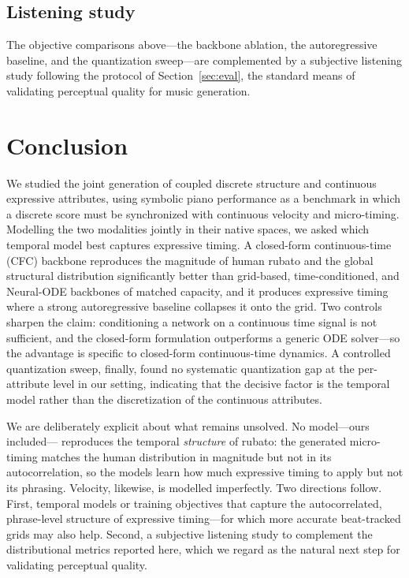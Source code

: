 \documentclass[review]{elsarticle}
\begin{document}
\subsection{Listening study}
The objective comparisons above---the backbone ablation, the autoregressive baseline, and
the quantization sweep---are complemented by a subjective listening study following the
protocol of Section~\ref{sec:eval}, the standard means of validating perceptual quality for
music generation.

\section{Conclusion}
\label{sec:conclusion}
We studied the joint generation of coupled discrete structure and continuous expressive
attributes, using symbolic piano performance as a benchmark in which a discrete score must
be synchronized with continuous velocity and micro-timing. Modelling the two modalities
jointly in their native spaces, we asked which temporal model best captures expressive
timing. A closed-form continuous-time (CFC) backbone reproduces the magnitude of human
rubato and the global structural distribution significantly better than grid-based,
time-conditioned, and Neural-ODE backbones of matched capacity, and it produces expressive
timing where a strong autoregressive baseline collapses it onto the grid. Two controls
sharpen the claim: conditioning a network on a continuous time signal is not sufficient, and
the closed-form formulation outperforms a generic ODE solver---so the advantage is specific
to closed-form continuous-time dynamics. A controlled quantization sweep, finally, found no
systematic quantization gap at the per-attribute level in our setting, indicating that the
decisive factor is the temporal model rather than the discretization of the continuous
attributes.

We are deliberately explicit about what remains unsolved. No model---ours included---
reproduces the temporal \emph{structure} of rubato: the generated micro-timing matches the
human distribution in magnitude but not in its autocorrelation, so the models learn how much
expressive timing to apply but not its phrasing. Velocity, likewise, is modelled
imperfectly. Two directions follow. First, temporal models or training objectives that
capture the autocorrelated, phrase-level structure of expressive timing---for which more
accurate beat-tracked grids may also help. Second, a subjective listening study to
complement the distributional metrics reported here, which we regard as the natural next
step for validating perceptual quality.



\end{document}
